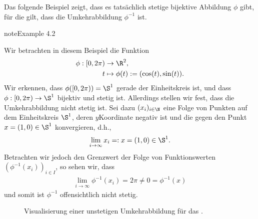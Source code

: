 \documentclass[letterpaper,10pt,german]{jupyterBook}
\let\sphinxpxdimen\pdfpxdimen\else\newdimen\sphinxpxdimen
\begin{document}
\sphinxAtStartPar
Das folgende Beispiel zeigt, dass es tatsächlich stetige bijektive Abbildung \(\phi\) gibt, für die gilt, dass die Umkehrabbildung \(\phi^{-1}\)  ist.
\label{manifolds/manifolds_prelim:ex:nonho}
\begin{sphinxadmonition}{note}{Example 4.2}



\sphinxAtStartPar
Wir betrachten in diesem Beispiel die Funktion
\begin{equation*}
\begin{split}\phi:[0,2\pi)&\to\R^2,\\
t &\mapsto \phi(t):= (\cos(t), \sin(t)).\end{split}
\end{equation*}
\sphinxAtStartPar
Wir erkennen, dass \(\phi([0,2\pi)) = \S^1\) gerade der Einheitskreis ist, und dass \(\phi:[0,2\pi)\to\S^1\) bijektiv und stetig ist.
Allerdings stellen wir fest, dass die Umkehrabbildung nicht stetig ist.
Sei dazu \((x_i)_{i\in\N}\) eine Folge von Punkten auf dem Einheitskreis \(\S^1\), deren \(y\)\sphinxhyphen{}Koordinate negativ ist und die gegen den Punkt \(x = (1,0) \in \S^1\) konvergieren, d.h.,
\begin{equation*}
\begin{split}\lim_{i\rightarrow\infty} x_i =: x = (1,0) \in \S^1.\end{split}
\end{equation*}
\sphinxAtStartPar
Betrachten wir jedoch den Grenzwert der Folge von Funktionswerten \((\phi^{-1}(x_i))_{i\in I}\), so sehen wir, dass
\begin{equation*}
\begin{split}\lim_{i\to\infty} \phi^{-1} (x_i) = 2\pi \neq 0 = \phi^{-1}(x)\end{split}
\end{equation*}
\sphinxAtStartPar
und somit ist \(\phi^{-1}\) offensichtlich nicht stetig.
\end{sphinxadmonition}

\begin{figure}[htbp]
\centering
\capstart

\noindent\sphinxincludegraphics[height=450\sphinxpxdimen]{{nonhomöo}.jpg}
\caption{Visualisierung einer unstetigen Umkehrabbildung für das {\hyperref[\detokenize{manifolds/manifolds_prelim:ex:nonho}]{}}.}\label{\detokenize{manifolds/manifolds_prelim:fig-nonh}}\end{figure}
\end{document}
